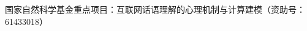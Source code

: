 \begin{resume}



  \begin{achievements}

  \item 国家自然科学基金重点项目：互联网话语理解的心理机制与计算建模（资助号：61433018）

  \end{achievements}


\end{resume}
